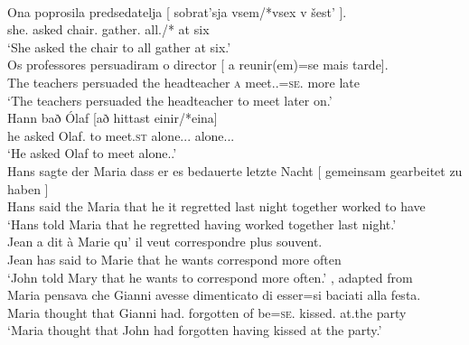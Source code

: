 \documentclass[output=paper]{langsci/langscibook}
\begin{document}
\ea\label{ex:24.2}  \parencite[909]{Landau2008}\\
	\gll    Ona   poprosila   predsedatelja [ sobrat’sja   vsem/*vsex   v šest’ ].\\
    she.\Nom{}   asked  chair.\Acc{} {} gather.\Inf{}   all.\Dat{}/*\Acc{}  at six\\
	\glt    ‘She asked the chair to all gather at six.’
\ex\label{ex:24.3}  \parencite[34]{Sheehan2018b}\\
	\gll Os professores   persuadiram   o director  [ a    reunir(em)=se     mais tarde].\\
    The teachers   persuaded   the headteacher {} \textsc{a} meet.\Inf{}.\Tpl=\textsc{se}.\Third{}   more late\\
	\glt ‘The teachers persuaded the headteacher to meet later on.’
\ex\label{ex:24.4}  \parencite[149]{Sheehan2018b}\\
	\gll Hann bað    Ólaf     [að   hittast     einir/*eina]\\
    he      asked Olaf.\Acc{}    to  meet.\textsc{st}   alone.\Nom.\M.\Pl{} alone.\Acc.\M.\Pl{}\\
	\glt ‘He asked Olaf to meet alone.\Pl{}.’
\ex\label{ex:24.5}  \parencite[45]{Landau2000}\\
	\gll Hans sagte der Maria dass er  es   bedauerte   letzte Nacht [ gemeinsam   gearbeitet   zu haben ]\\
    Hans said   the Maria that    he it   regretted   last night {} together     worked   to have\\
	\glt ‘Hans told Maria that he regretted having worked together last night.’
\ex\label{ex:24.6}  \parencite[85]{Landau2000}\\
	\gll Jean a    dit      à Marie  qu’   il  veut    correspondre plus  souvent.\\
		Jean has said   to Marie that he wants correspond    more often\\
	\glt ‘John told Mary that he wants to correspond more often.’
\ex\label{ex:24.7} , adapted from \parencite[46]{Landau2000}\\
	\gll Maria pensava che Gianni avesse dimenticato di esser=si baciati alla festa.\\
		Maria thought that Gianni had.\Sbjv{} forgotten of be=\textsc{se}.\Third{} kissed.\Pl{} at.the party\\
	\glt ‘Maria thought that John had forgotten having kissed at the party.’
\z
\end{document}

